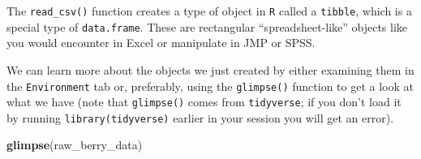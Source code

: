 \documentclass[
]{book}
\newenvironment{Shaded}{\begin{snugshade}}{\end{snugshade}}
\newcommand{\FunctionTok}[1]{\textcolor[rgb]{0.13,0.29,0.53}{\textbf{#1}}}
\newcommand{\NormalTok}[1]{#1}
\begin{document}
The \texttt{read\_csv()} function creates a type of object in \texttt{R} called a \texttt{tibble}, which is a special type of \texttt{data.frame}. These are rectangular ``spreadsheet-like'' objects like you would encounter in Excel or manipulate in JMP or SPSS.

We can learn more about the objects we just created by either examining them in the \texttt{Environment} tab or, preferably, using the \texttt{glimpse()} function to get a look at what we have (note that \texttt{glimpse()} comes from \texttt{tidyverse}; if you don't load it by running \texttt{library(tidyverse)} earlier in your session you will get an error).

\begin{Shaded}
\begin{Highlighting}[]
\FunctionTok{glimpse}\NormalTok{(raw\_berry\_data)}
\end{Highlighting}
\end{Shaded}
\end{document}
